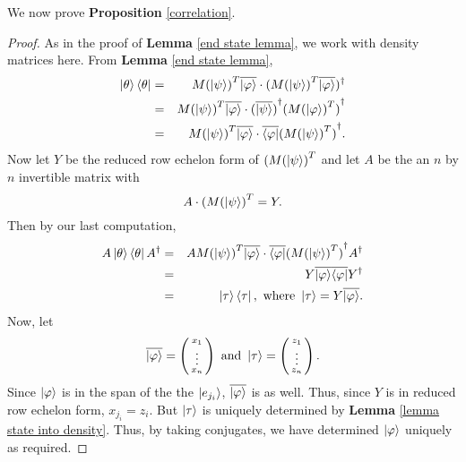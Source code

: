 We now prove {\bf{Proposition}} \ref{correlation}.
\begin{proof}
As in the proof of {\bf{Lemma}} \ref{end state lemma}, we work with density matrices here.  From {\bf{Lemma}} \ref{end state lemma},
\begin{eqnarray}
\ket{\theta}\bra{\theta}&=&{M(\ket{\psi})}^T\overline{\ket{\varphi}}\cdot({M(\ket{\psi})}^T\overline{\ket{\varphi}})^\dagger\\
&=&{M(\ket{\psi})}^T\overline{\ket{\varphi}}\cdot {(\overline{\ket{\psi}})}^\dagger {({M(\ket{\varphi})}^T)}^\dagger \\
&=&{M(\ket{\psi})}^T\overline{\ket{\varphi}}\cdot \overline{\bra{\varphi}} {({M(\ket{\psi})}^T)}^\dagger.
\end{eqnarray}
Now let $Y$ be the reduced row echelon form of $({M(\ket{\psi})}^T$ and let $A$ be the an $n$ by $n$ invertible matrix with
\begin{equation}
A \cdot ({M(\ket{\psi})}^T=Y.
\end{equation}
Then by our last computation,
\begin{eqnarray}
A\ket{\theta}\bra{\theta}A^\dagger&=&A {M(\ket{\psi})}^T\overline{\ket{\varphi}}\cdot \overline{\bra{\varphi}} {({M(\ket{\psi})}^T)}^\dagger A^\dagger\\
&=&Y \overline{\ket{\varphi}} \overline{\bra{\varphi}} Y^\dagger\\
&=& \ket{\tau}\bra{\tau},\textrm{ where }\ket{\tau}=Y\overline{\ket{\varphi}}.
\end{eqnarray}
Now, let 
\begin{equation}
\overline{\ket{\varphi}}=\left(\begin{smallmatrix}x_1 \\ \vdots \\ x_n\end{smallmatrix}\right) \textrm{ and }\ket{\tau}=\left(\begin{smallmatrix}z_1\\ \vdots \\ z_n\end{smallmatrix}\right).
\end{equation}
Since $\ket{\varphi}$ is in the span of the the $\ket{e_{j_i}}$, $\overline{\ket{\varphi}}$ is as well.  Thus, since $Y$ is in reduced row echelon form, $x_{j_i}=z_i$.  But $\ket{\tau}$ is uniquely determined by {\bf{Lemma}} \ref{lemma state into density}.  Thus, by taking conjugates, we have determined $\ket{\varphi}$ uniquely as required.


\end{proof} 



